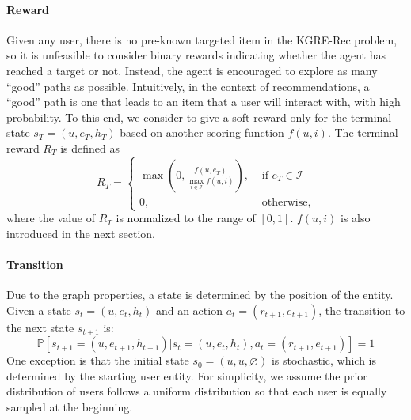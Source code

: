 \documentclass[sigconf]{acmart}
\begin{document}
\paragraph{Reward}
Given any user, there is no pre-known targeted item in the KGRE-Rec problem, so it is unfeasible to consider binary rewards indicating whether the agent has reached a target or not.
Instead, the agent is encouraged to explore as many ``good'' paths as possible.
Intuitively, in the context of recommendations, a ``good'' path is one that leads to an item that a user will interact with, with high probability.
To this end, we consider to give a soft reward only for the terminal state $s_T=(u,e_T,h_T)$ based on another scoring function $f(u,i)$. The terminal reward $R_T$ is defined as
\begin{equation}\label{eq:reward}
R_T = 
\begin{cases}
\max \left(0,\frac{f(u,e_T)}{\max_{i\in\mathcal{I}}f(u,i)}\right), & \text{~if~} e_T\in\mathcal{I} \\
0, & \text{~otherwise,}
\end{cases}
\end{equation}
where the value of $R_T$ is normalized to the range of $[0, 1]$. $f(u,i)$ is also introduced in the next section.

\paragraph{Transition}
Due to the graph properties, a state is determined by the position of the entity. 
Given a state $s_t=(u,e_t,h_t)$ and an action $a_t=(r_{t+1},e_{t+1})$, the transition to the next state $s_{t+1}$ is: 
\begin{equation}
\mathds{P}\left[s_{t+1}=(u,e_{t+1},h_{t+1})|s_t=(u,e_t,h_t),a_t=(r_{t+1},e_{t+1})\right]=1
\end{equation}
One exception is that the initial state $s_0=(u,u,\varnothing)$ is stochastic, which is determined by the starting user entity.
For simplicity, we assume the prior distribution of users follows a uniform distribution so that each user is equally sampled at the beginning.
\end{document}
